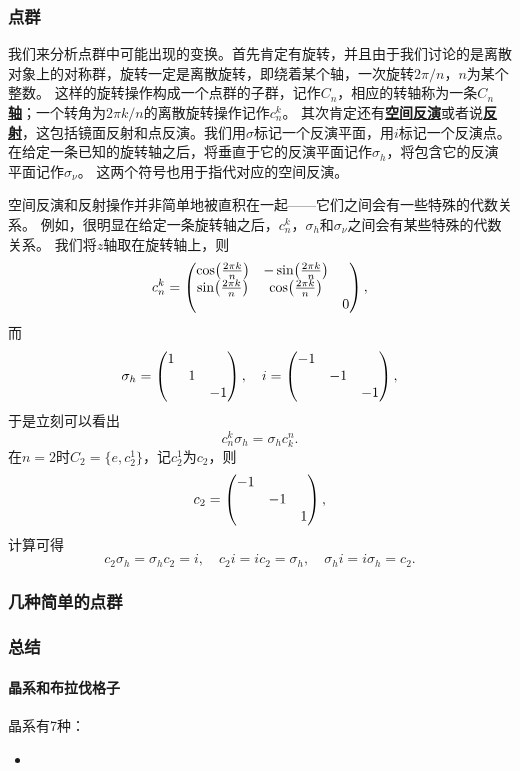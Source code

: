 \documentclass[hyperref, UTF8, a4paper]{ctexart}
\newcommand*{\concept}[1]{\underline{\textbf{#1}}}
\begin{document}
\subsubsection{点群}

我们来分析点群中可能出现的变换。首先肯定有旋转，并且由于我们讨论的是离散对象上的对称群，旋转一定是离散旋转，即绕着某个轴，一次旋转$2\pi / n$，$n$为某个整数。
这样的旋转操作构成一个点群的子群，记作$C_{n}$，相应的转轴称为一条\concept{$C_{n}$轴}；一个转角为$2\pi k / n$的离散旋转操作记作$c_n^k$。
其次肯定还有\concept{空间反演}或者说\concept{反射}，这包括镜面反射和点反演。我们用$\sigma$标记一个反演平面，用$i$标记一个反演点。
在给定一条已知的旋转轴之后，将垂直于它的反演平面记作$\sigma_h$，将包含它的反演平面记作$\sigma_\nu$。
这两个符号也用于指代对应的空间反演。

空间反演和反射操作并非简单地被直积在一起——它们之间会有一些特殊的代数关系。
例如，很明显在给定一条旋转轴之后，$c_n^k$，$\sigma_h$和$\sigma_\nu$之间会有某些特殊的代数关系。
我们将$z$轴取在旋转轴上，则
\begin{equation}
    c_n^k = \pmqty{\dmat{ \cos(\frac{2\pi k}{n}) & -\sin(\frac{2\pi k}{n}) \\ \sin(\frac{2\pi k}{n}) & \cos(\frac{2\pi k}{n}), 0 }},
\end{equation}
而
\begin{equation}
    \sigma_h = \pmqty{\dmat{1, 1, -1}}, \quad i = \pmqty{\dmat{-1, -1, -1}},
\end{equation}
于是立刻可以看出
\begin{equation}
    c_n^k \sigma_h = \sigma_h c^n_k.
\end{equation}
在$n=2$时$C_2=\{e, c^1_2\}$，记$c^1_2$为$c_2$，则
\begin{equation}
    c_2 = \pmqty{\dmat{-1, -1, 1}},
\end{equation}
计算可得
\begin{equation}
    c_2 \sigma_h = \sigma_h c_2 = i, \quad c_2 i = i c_2 = \sigma_h, \quad \sigma_h i = i \sigma_h = c_2.
\end{equation}

\subsubsection{几种简单的点群}

\subsubsection{总结}

\paragraph{晶系和布拉伐格子} 晶系有7种：
\begin{itemize}
    \item 
\end{itemize}
\end{document}
